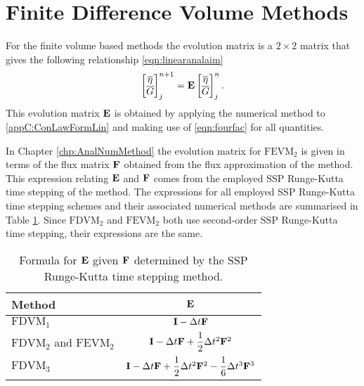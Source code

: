 \section{Finite Difference Volume Methods}
For the finite volume based methods the evolution matrix is a $2\times2$ matrix that gives the following relationship \eqref{eqn:linearanalaim}
\begin{equation*}
\label{eqn:AppDEFDVM}
\begin{bmatrix}
\overline{\eta} \\\overline{G} 
\end{bmatrix}^{n+1}_j = \mathbf{E} \begin{bmatrix}
\overline{\eta} \\\overline{G}
\end{bmatrix}^{n}_j.
\end{equation*}
This evolution matrix $\mathbf{E}$ is obtained by applying the numerical method to \eqref{appC:ConLawFormLin} and making use of \eqref{eqn:fourfac} for all quantities.

In Chapter \ref{chp:AnalNumMethod} the evolution matrix for $\text{FEVM}_2$ is given in terms of the flux matrix $\mathbf{F}$ obtained from the flux approximation of the method. This expression relating $\mathbf{E}$ and $\mathbf{F}$ comes from the employed SSP Runge-Kutta time stepping of the method. The expressions for all employed SSP Runge-Kutta time stepping schemes and their associated numerical methods are summarised in Table \ref{tab:RKstepfactor}. Since $\text{FDVM}_2$ and $\text{FEVM}_2$ both use second-order SSP Runge-Kutta time stepping, their expressions are the same. 

\begin{table}
	\centering
	\begin{tabular}{l  c}
		Method & $\mathbf{E}$  \T\B \\
		\hline 
		$\text{FDVM}_1$& $\mathbf{I} - \Delta t\mathbf{F} $  \T\B \\
		$\text{FDVM}_2$ and $\text{FEVM}_2$ & $ \mathbf{I}  -\Delta t\mathbf{F} + \dfrac{1}{2}\Delta t^2\mathbf{F}^2$  \T\B \\
		$\text{FDVM}_3$& $\mathbf{I} -\Delta t\mathbf{F} + \dfrac{1}{2}\Delta t^2 \mathbf{F}^2 - \dfrac{1}{6}\Delta t^3 \mathbf{F}^3 $  \T\B \\
		\hline
	\end{tabular}
	\caption{Formula for $\mathbf{E}$ given $\mathbf{F}$ determined by the SSP Runge-Kutta time stepping method.}
	\label{tab:RKstepfactor}
\end{table}

